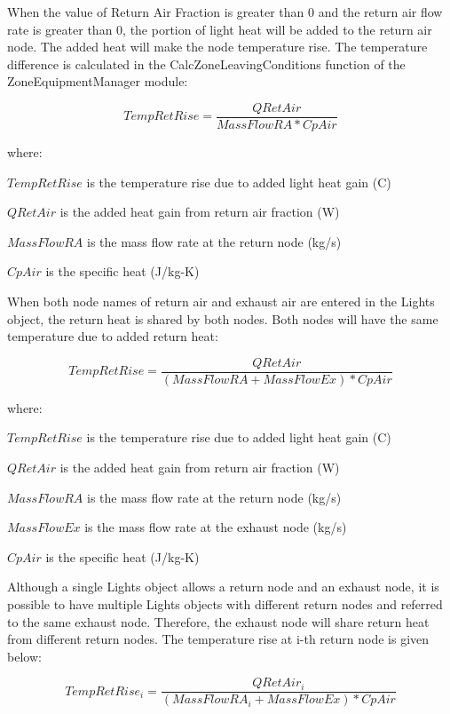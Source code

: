 When the value of Return Air Fraction is greater than 0 and  the return air flow rate is greater than 0, the portion of light heat will be added to the return air node. The added heat will make the node temperature rise. The temperature difference is calculated in the CalcZoneLeavingConditions function of the ZoneEquipmentManager module:


\begin{equation}
TempRetRise =  \frac{QRetAir} {MassFlowRA * CpAir}
\end{equation}

where:

\(TempRetRise\) is the temperature rise due to added light heat gain (C)

\(QRetAir\) is the added heat gain from return air fraction (W)

\(MassFlowRA\) is the mass flow rate at the return node (kg/s)

\(CpAir\) is the specific heat (J/kg-K)

When both node names of return air and exhaust air are entered in the Lights object, the return heat is shared by both nodes. Both nodes will have the same temperature due to added return heat:

\begin{equation}
TempRetRise = \frac{QRetAir} {(MassFlowRA + MassFlowEx ) * CpAir}
\end{equation}

where:

\(TempRetRise\) is the temperature rise due to added light heat gain (C)

\(QRetAir\) is the added heat gain from return air fraction (W)

\(MassFlowRA\) is the mass flow rate at the return node (kg/s)

\(MassFlowEx\) is the mass flow rate at the exhaust node (kg/s)

\(CpAir\) is the specific heat (J/kg-K)

Although a single Lights object allows a return node and an exhaust node, it is possible to have multiple Lights objects with different return nodes and referred to the same exhaust node. Therefore, the exhaust node will share return heat from different return nodes. The temperature rise at i-th return node is given below:

\begin{equation}
TempRetRise_i = \frac{QRetAir_i} {(MassFlowRA_i + MassFlowEx ) * CpAir}
\end{equation}

